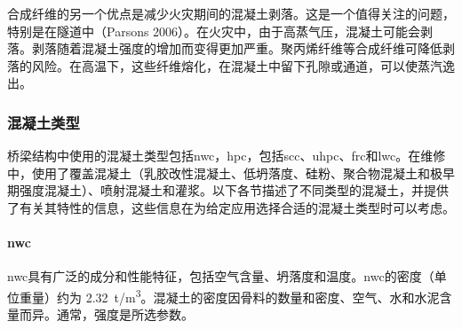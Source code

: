 合成纤维的另一个优点是减少火灾期间的混凝土剥落。这是一个值得关注的问题，特别是在隧道中（Parsons 2006）。在火灾中，由于高蒸气压，混凝土可能会剥落。剥落随着混凝土强度的增加而变得更加严重。聚丙烯纤维等合成纤维可降低剥落的风险。在高温下，这些纤维熔化，在混凝土中留下孔隙或通道，可以使蒸汽逸出。

\subsubsection{混凝土类型}
桥梁结构中使用的混凝土类型包括\acrlong*{nwc}，\acrlong*{hpc}，包括\acrlong*{scc}、\acrlong{uhpc}、\acrlong{frc}和\acrlong{lwc}。在维修中，使用了覆盖混凝土（乳胶改性混凝土、低坍落度、硅粉、聚合物混凝土和极早期强度混凝土）、喷射混凝土和灌浆。以下各节描述了不同类型的混凝土，并提供了有关其特性的信息，这些信息在为给定应用选择合适的混凝土类型时可以考虑。

\paragraph{\acrfull*{nwc}}
\acrlong*{nwc}具有广泛的成分和性能特征，包括空气含量、坍落度和温度。\acrlong*{nwc}的密度（单位重量）约为 \qty{2.32}{t/m^3}。混凝土的密度因骨料的数量和密度、空气、水和水泥含量而异。通常，强度是所选参数。


